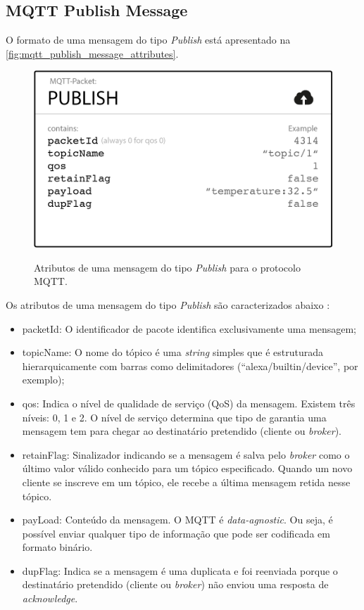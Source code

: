 \subsection{MQTT Publish Message}\label{subsection:mqtt_publish_message}

O formato de uma mensagem do tipo \textit{Publish} está apresentado na \autoref{fig:mqtt_publish_message_attributes}.

\begin{figure}[htbp]
    \centering
    \caption{Atributos de uma mensagem do tipo \textit{Publish} para o protocolo MQTT.}
    \includegraphics[scale=0.5]{Imagens/mqtt_publish_message_attributes.png}
    \label{fig:mqtt_publish_message_attributes}
\end{figure}

Os atributos de uma mensagem do tipo \textit{Publish} são caracterizados abaixo \cite{ref:026}:

\begin{itemize}
    \item packetId: O identificador de pacote identifica exclusivamente uma mensagem;
    \item topicName: O nome do tópico é uma \textit{string} simples que é estruturada hierarquicamente com barras como delimitadores (``alexa/builtin/device'', por exemplo);
    \item qos: Indica o nível de qualidade de serviço (QoS) da mensagem. Existem três níveis: 0, 1 e 2. O nível de serviço determina que tipo de garantia uma mensagem tem para chegar ao destinatário pretendido (cliente ou \textit{broker}).
    \item retainFlag: Sinalizador indicando se a mensagem é salva pelo \textit{broker} como o último valor válido conhecido para um tópico especificado. Quando um novo cliente se inscreve em um tópico, ele recebe a última mensagem retida nesse tópico.
    \item payLoad: Conteúdo da mensagem. O MQTT é \textit{data-agnostic}. Ou seja, é possível enviar qualquer tipo de informação que pode ser codificada em formato binário.
    \item dupFlag: Indica se a mensagem é uma duplicata e foi reenviada porque o destinatário pretendido (cliente ou \textit{broker}) não enviou uma resposta de \textit{acknowledge}.
\end{itemize}

